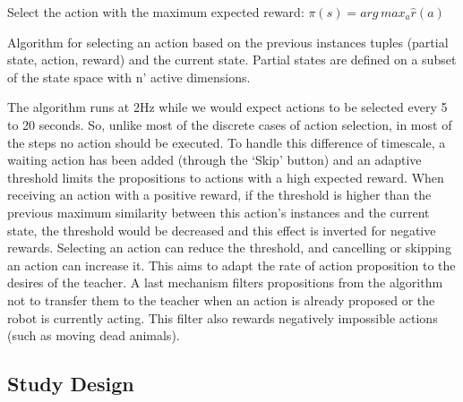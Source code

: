 \begin{algorithm}
	\DontPrintSemicolon
	Select the action with the maximum expected reward:
	$\pi(s) = arg\, max_{a} \hat{r}(a)$
	
	
	\caption{Algorithm for selecting an action based on the previous instances tuples (partial state, action, reward) and the current state. Partial states are defined on a subset of the state space with n' active dimensions.}
	\label{algo:tuto}
\end{algorithm}

The algorithm runs at 2Hz while we would expect actions to be selected every 5 to 20 seconds. So, unlike most of the discrete cases of action selection, in most of the steps no action should be executed. To handle this difference of timescale, a waiting action has been added (through the `Skip' button) and an adaptive threshold limits the propositions to actions with a high expected reward. When receiving an action with a positive reward, if the threshold is higher than the previous maximum similarity between this action's instances and the current state, the threshold would be decreased and this effect is inverted for negative rewards. Selecting an action can reduce the threshold, and cancelling or skipping an action can increase it. This aims to adapt the rate of action proposition to the desires of the teacher. A last mechanism filters propositions from the algorithm not to transfer them to the teacher when an action is already proposed or the robot is currently acting. This filter also rewards negatively impossible actions (such as moving dead animals).

\subsection{Study Design}

